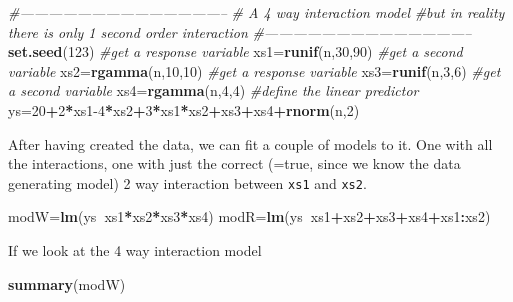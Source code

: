 \documentclass[
]{book}
\newenvironment{Shaded}{\begin{snugshade}}{\end{snugshade}}
\newcommand{\CommentTok}[1]{\textcolor[rgb]{0.56,0.35,0.01}{\textit{#1}}}
\newcommand{\DecValTok}[1]{\textcolor[rgb]{0.00,0.00,0.81}{#1}}
\newcommand{\KeywordTok}[1]{\textcolor[rgb]{0.13,0.29,0.53}{\textbf{#1}}}
\newcommand{\NormalTok}[1]{#1}
\newcommand{\OperatorTok}[1]{\textcolor[rgb]{0.81,0.36,0.00}{\textbf{#1}}}
\begin{document}
\begin{Shaded}
\begin{Highlighting}[]
\CommentTok{#--------------------------------------------}
\CommentTok{# A 4 way interaction model}
\CommentTok{#but in reality there is only 1 second order interaction}
\CommentTok{#--------------------------------------------}
\KeywordTok{set.seed}\NormalTok{(}\DecValTok{123}\NormalTok{)}
\CommentTok{#get a response variable}
\NormalTok{xs1=}\KeywordTok{runif}\NormalTok{(n,}\DecValTok{30}\NormalTok{,}\DecValTok{90}\NormalTok{)}
\CommentTok{#get a second variable}
\NormalTok{xs2=}\KeywordTok{rgamma}\NormalTok{(n,}\DecValTok{10}\NormalTok{,}\DecValTok{10}\NormalTok{)}
\CommentTok{#get a response variable}
\NormalTok{xs3=}\KeywordTok{runif}\NormalTok{(n,}\DecValTok{3}\NormalTok{,}\DecValTok{6}\NormalTok{)}
\CommentTok{#get a second variable}
\NormalTok{xs4=}\KeywordTok{rgamma}\NormalTok{(n,}\DecValTok{4}\NormalTok{,}\DecValTok{4}\NormalTok{)}
\CommentTok{#define the linear predictor}
\NormalTok{ys=}\DecValTok{20}\OperatorTok{+}\DecValTok{2}\OperatorTok{*}\NormalTok{xs1}\DecValTok{-4}\OperatorTok{*}\NormalTok{xs2}\OperatorTok{+}\DecValTok{3}\OperatorTok{*}\NormalTok{xs1}\OperatorTok{*}\NormalTok{xs2}\OperatorTok{+}\NormalTok{xs3}\OperatorTok{+}\NormalTok{xs4}\OperatorTok{+}\KeywordTok{rnorm}\NormalTok{(n,}\DecValTok{2}\NormalTok{)}
\end{Highlighting}
\end{Shaded}

After having created the data, we can fit a couple of models to it. One with all the interactions, one with just the correct (=true, since we know the data generating model) 2 way interaction between \texttt{xs1} and \texttt{xs2}.

\begin{Shaded}
\begin{Highlighting}[]
\NormalTok{modW=}\KeywordTok{lm}\NormalTok{(ys}\OperatorTok{~}\NormalTok{xs1}\OperatorTok{*}\NormalTok{xs2}\OperatorTok{*}\NormalTok{xs3}\OperatorTok{*}\NormalTok{xs4)}
\NormalTok{modR=}\KeywordTok{lm}\NormalTok{(ys}\OperatorTok{~}\NormalTok{xs1}\OperatorTok{+}\NormalTok{xs2}\OperatorTok{+}\NormalTok{xs3}\OperatorTok{+}\NormalTok{xs4}\OperatorTok{+}\NormalTok{xs1}\OperatorTok{:}\NormalTok{xs2)}
\end{Highlighting}
\end{Shaded}

If we look at the 4 way interaction model

\begin{Shaded}
\begin{Highlighting}[]
\KeywordTok{summary}\NormalTok{(modW)}
\end{Highlighting}
\end{Shaded}
\end{document}
